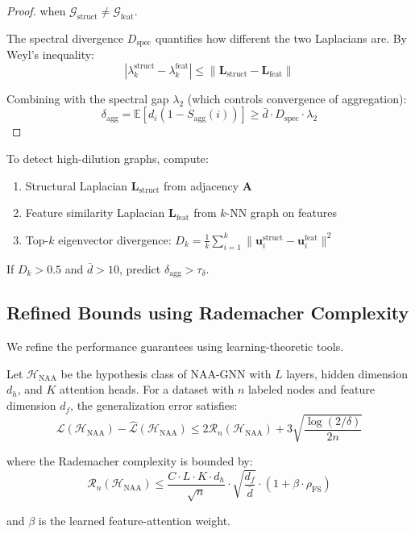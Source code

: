 \begin{proof}
when $\mathcal{G}_{\text{struct}} \neq \mathcal{G}_{\text{feat}}$.

The spectral divergence $D_{\text{spec}}$ quantifies how different the two Laplacians are. By Weyl's inequality:
\begin{equation}
|\lambda_k^{\text{struct}} - \lambda_k^{\text{feat}}| \leq \|\mathbf{L}_{\text{struct}} - \mathbf{L}_{\text{feat}}\|
\end{equation}

Combining with the spectral gap $\lambda_2$ (which controls convergence of aggregation):
\begin{equation}
\delta_{\text{agg}} = \mathbb{E}[d_i(1-S_{\text{agg}}(i))] \geq \bar{d} \cdot D_{\text{spec}} \cdot \lambda_2
\end{equation}
\end{proof}

\begin{corollary}
\label{cor:spectral_detection}
To detect high-dilution graphs, compute:
\begin{enumerate}
\item Structural Laplacian $\mathbf{L}_{\text{struct}}$ from adjacency $\mathbf{A}$
\item Feature similarity Laplacian $\mathbf{L}_{\text{feat}}$ from $k$-NN graph on features
\item Top-$k$ eigenvector divergence: $D_k = \frac{1}{k}\sum_{i=1}^k \|\mathbf{u}_i^{\text{struct}} - \mathbf{u}_i^{\text{feat}}\|^2$
\end{enumerate}

If $D_k > 0.5$ and $\bar{d} > 10$, predict $\delta_{\text{agg}} > \tau_\delta$.
\end{corollary}

\subsection{Refined Bounds using Rademacher Complexity}

We refine the performance guarantees using learning-theoretic tools.

\begin{theorem}
\label{thm:rademacher}
Let $\mathcal{H}_{\text{NAA}}$ be the hypothesis class of NAA-GNN with $L$ layers, hidden dimension $d_h$, and $K$ attention heads. For a dataset with $n$ labeled nodes and feature dimension $d_f$, the generalization error satisfies:
\begin{equation}
\mathcal{L}(\mathcal{H}_{\text{NAA}}) - \hat{\mathcal{L}}(\mathcal{H}_{\text{NAA}}) \leq 2\mathcal{R}_n(\mathcal{H}_{\text{NAA}}) + 3\sqrt{\frac{\log(2/\delta)}{2n}}
\end{equation}

where the Rademacher complexity is bounded by:
\begin{equation}
\mathcal{R}_n(\mathcal{H}_{\text{NAA}}) \leq \frac{C \cdot L \cdot K \cdot d_h}{\sqrt{n}} \cdot \sqrt{\frac{d_f}{\bar{d}}} \cdot (1 + \beta \cdot \rho_{\text{FS}})
\end{equation}

and $\beta$ is the learned feature-attention weight.
\end{theorem}


